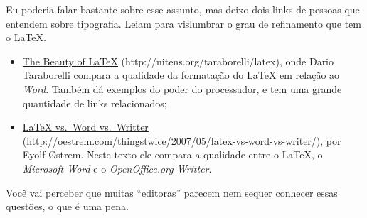Eu poderia falar bastante sobre esse assunto, mas deixo dois links de pessoas que entendem sobre tipografia. Leiam para vislumbrar o grau de refinamento que tem o \LaTeX.

\begin{itemize}
	\item \href{http://nitens.org/taraborelli/latex}{The Beauty of \LaTeX} ({\sf http://nitens.org/taraborelli/latex}), onde Dario Taraborelli compara a qualidade da formatação do \LaTeX{} em relação ao \emph{Word}. Também dá exemplos do poder do processador, e tem uma grande quantidade de links relacionados;
	\item \href{http://oestrem.com/thingstwice/2007/05/latex-vs-word-vs-writer/}{\LaTeX{} vs.~Word vs.~Writter} (\textsf{http://oestrem.com/thingstwice/2007/05/latex-vs-word-vs-writer/}), por Eyolf \O strem. Neste texto ele compara a qualidade entre o \LaTeX{}, o \emph{Microsoft Word} e o \emph{OpenOffice.org Writter}.
\end{itemize}

Você vai perceber que muitas ``editoras'' parecem nem sequer conhecer essas questões, o que é uma pena.
